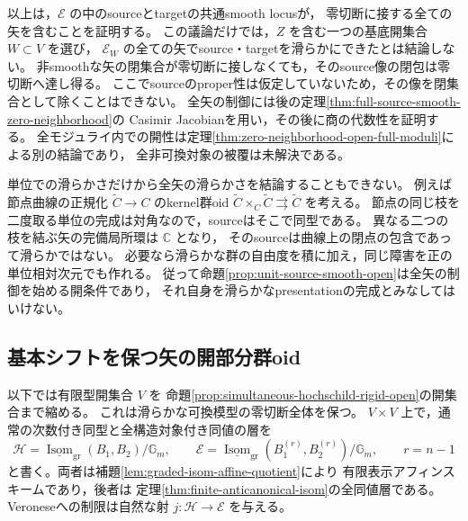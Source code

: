 \begin{remark}[単位近傍の滑らかさと全矢の制御]
以上は，$\mathcal E$ の中のsourceとtargetの共通smooth locusが，
零切断に接する全ての矢を含むことを証明する。
この議論だけでは，$Z$ を含む一つの基底開集合 $W\subset V$ を選び，
$\mathcal E_W$ の全ての矢でsource・targetを滑らかにできたとは結論しない。
非smoothな矢の閉集合が零切断に接しなくても，そのsource像の閉包は零切断へ達し得る。
ここでsourceのproper性は仮定していないため，その像を閉集合として除くことはできない。
全矢の制御には後の定理\ref{thm:full-source-smooth-zero-neighborhood}の
Casimir Jacobianを用い，その後に商の代数性を証明する。
全モジュライ内での開性は定理\ref{thm:zero-neighborhood-open-full-moduli}による別の結論であり，
全非可換対象の被覆は未解決である。

単位での滑らかさだけから全矢の滑らかさを結論することもできない。
例えば節点曲線の正規化 $\widetilde C\to C$ のkernel群oid
$\widetilde C\times_C\widetilde C\rightrightarrows\widetilde C$ を考える。
節点の同じ枝を二度取る単位の完成は対角なので，sourceはそこで同型である。
異なる二つの枝を結ぶ矢の完備局所環は $\mathbb C$ となり，
そのsourceは曲線上の閉点の包含であって滑らかではない。
必要なら滑らかな群の自由度を積に加え，同じ障害を正の単位相対次元でも作れる。
従って命題\ref{prop:unit-source-smooth-open}は全矢の制御を始める開条件であり，
それ自身を滑らかなpresentationの完成とみなしてはいけない。
\end{remark}

\subsection{基本シフトを保つ矢の開部分群oid}

以下では有限型開集合 $V$ を
命題\ref{prop:simultaneous-hochschild-rigid-open}の開集合まで縮める。
これは滑らかな可換模型の零切断全体を保つ。
$V\times V$ 上で，通常の次数付き同型と全構造対象付き同値の層を
\[
 \mathcal H=
 \underline{\operatorname{Isom}}_{\mathrm{gr}}(B_1,B_2)/\mathbb G_m,
 \qquad
 \mathcal E=
 \underline{\operatorname{Isom}}_{\mathrm{gr}}
       (B_1^{(r)},B_2^{(r)})/\mathbb G_m,
 \qquad r=n-1
\]
と書く。両者は補題\ref{lem:graded-isom-affine-quotient}により
有限表示アフィンスキームであり，後者は
定理\ref{thm:finite-anticanonical-isom}の全同値層である。
Veroneseへの制限は自然な射 $j:\mathcal H\to\mathcal E$ を与える。

